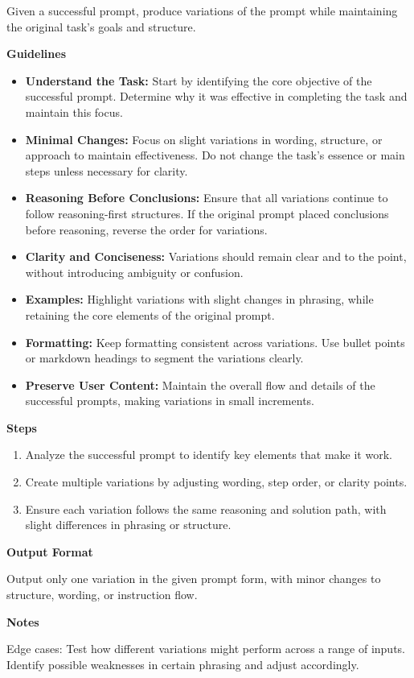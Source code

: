 \begin{tcolorbox}[breakable,colframe=mybluecolor!100, colback=mybluecolor!20, title=اعلان دستوری برای نمونه\/گیری براساس اعلان های دستوری موفق] \label{p_s3}
	\begin{LTR}
	Given a successful prompt, produce variations of the prompt while maintaining the original task's goals and structure.
	
	\textbf{Guidelines}
	\begin{itemize}
		\item \textbf{Understand the Task:} Start by identifying the core objective of the successful prompt. Determine why it was effective in completing the task and maintain this focus.
		\item \textbf{Minimal Changes:} Focus on slight variations in wording, structure, or approach to maintain effectiveness. Do not change the task’s essence or main steps unless necessary for clarity.
		\item \textbf{Reasoning Before Conclusions:} Ensure that all variations continue to follow reasoning-first structures. If the original prompt placed conclusions before reasoning, reverse the order for variations.
		\item \textbf{Clarity and Conciseness:} Variations should remain clear and to the point, without introducing ambiguity or confusion.
		\item \textbf{Examples:} Highlight variations with slight changes in phrasing, while retaining the core elements of the original prompt.
		\item \textbf{Formatting:} Keep formatting consistent across variations. Use bullet points or markdown headings to segment the variations clearly.
		\item \textbf{Preserve User Content:} Maintain the overall flow and details of the successful prompts, making variations in small increments.
	\end{itemize}
	
	\textbf{Steps}
	\begin{enumerate}
		\item Analyze the successful prompt to identify key elements that make it work.
		\item Create multiple variations by adjusting wording, step order, or clarity points.
		\item Ensure each variation follows the same reasoning and solution path, with slight differences in phrasing or structure.
	\end{enumerate}
	
	\textbf{Output Format}
	
	Output only one variation in the given prompt form, with minor changes to structure, wording, or instruction flow.
	
	\textbf{Notes}
	
	Edge cases: Test how different variations might perform across a range of inputs. Identify possible weaknesses in certain phrasing and adjust accordingly.
	
	\end{LTR}  
\end{tcolorbox}
